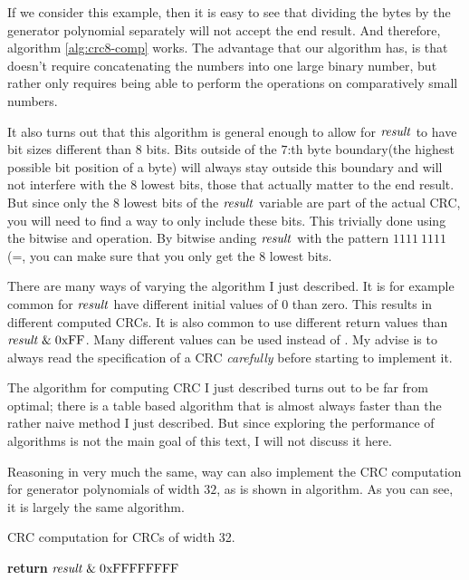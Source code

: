 If we consider this example, then it is easy to see that dividing the
bytes by the generator polynomial separately will not accept the end
result. And therefore, algorithm \ref{alg:crc8-comp} works. The
advantage that our algorithm has, is that doesn't require
concatenating the numbers into one large binary number, but rather
only requires being able to perform the operations on comparatively
small numbers.

It also turns out that this algorithm is general enough to allow for
$\mathit{result}$ to have bit sizes different than 8 bits. Bits outside of the
$7$:th byte boundary(the highest possible bit position of a byte) will
always stay outside this boundary and will not interfere with the 8
lowest bits, those that actually matter to the end result. But since
only the 8 lowest bits of the $\mathit{result}$ variable are part of the actual
CRC, you will need to find a way to only include these bits. This
trivially done using the bitwise and operation. By bitwise anding
$\mathit{result}$ with the pattern $1111\ 1111$(=, you can make sure
that you only get the 8 lowest bits.

There are many ways of varying the algorithm I just described. It is
for example common for $\mathit{result}$ have different initial values of $0$
than zero. This results in different computed CRCs. It is also common
to use different return values than $\mathit{result} \mathrel{\&} \mathrm{0xFF}$. Many
different values can be used instead of . My advise is to
always read the specification of a CRC \textit{carefully} before
starting to implement it.

The algorithm for computing CRC I just described turns out to be far
from optimal; there is a table based algorithm that is almost always
faster than the rather naive method I just described. But since
exploring the performance of algorithms is not the main goal of this
text, I will not discuss it here.

Reasoning in very much the same, way can also implement the CRC
computation for generator polynomials of width $32$, as is shown in
algorithm. As you can see, it is largely the same algorithm.

\begin{algorithm}[H]
  \caption{CRC computation for CRCs of width 32.}
  \label{alg:crc32-comp}
  \begin{algorithmic}[1]


    \Else
    \EndIf
    \EndRepeatn

    \EndForEach

    \State \textbf{return}  $\mathit{result} \mathrel{\&} \mathrm{0xFFFFFFFF}$
    \EndProcedure

  \end{algorithmic}
\end{algorithm}

